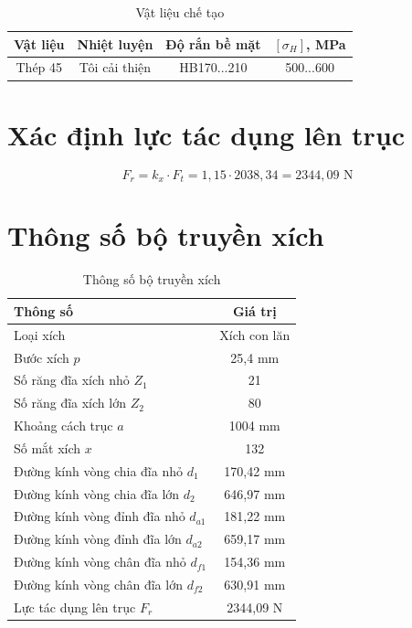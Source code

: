 \documentclass[12pt,a4paper]{report}
\begin{document}
\begin{table}[H]
    \centering
    \caption{Vật liệu chế tạo}
    \label{tab:2.1}
    \begin{tabular}{|c|c|c|c|}
        \hline
        Vật liệu & Nhiệt luyện & Độ rắn bề mặt & $[\sigma_H]$, MPa \\
        \hline
        Thép 45 & Tôi cải thiện & HB170...210 & 500...600 \\
        \hline
    \end{tabular}
\end{table}

\section{Xác định lực tác dụng lên trục}
$$F_r = k_x \cdot F_t = 1{,}15 \cdot 2038{,}34 = 2344{,}09 \text{ N}$$

\section{Thông số bộ truyền xích}
\begin{table}[H]
    \centering
    \caption{Thông số bộ truyền xích}
    \label{tab:2.2}
    \begin{tabular}{|l|c|}
        \hline
        \textbf{Thông số} & \textbf{Giá trị} \\
        \hline
        Loại xích & Xích con lăn \\
        Bước xích $p$ & 25,4 mm \\
        Số răng đĩa xích nhỏ $Z_1$ & 21 \\
        Số răng đĩa xích lớn $Z_2$ & 80 \\
        Khoảng cách trục $a$ & 1004 mm \\
        Số mắt xích $x$ & 132 \\
        Đường kính vòng chia đĩa nhỏ $d_1$ & 170,42 mm \\
        Đường kính vòng chia đĩa lớn $d_2$ & 646,97 mm \\
        Đường kính vòng đỉnh đĩa nhỏ $d_{a1}$ & 181,22 mm \\
        Đường kính vòng đỉnh đĩa lớn $d_{a2}$ & 659,17 mm \\
        Đường kính vòng chân đĩa nhỏ $d_{f1}$ & 154,36 mm \\
        Đường kính vòng chân đĩa lớn $d_{f2}$ & 630,91 mm \\
        Lực tác dụng lên trục $F_r$ & 2344,09 N \\
        \hline
    \end{tabular}
\end{table}
\end{document}

